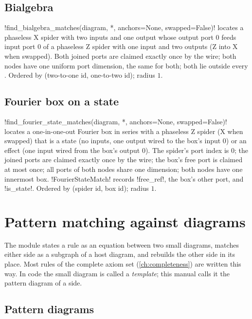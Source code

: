 \subsection{Bialgebra}

\py!find_bialgebra_matches(diagram, *, anchors=None, swapped=False)! locates a phaseless X spider
with two inputs and one output whose output port $0$ feeds input port $0$ of a phaseless Z spider
with one input and two outputs (Z into X when swapped). Both joined ports are claimed exactly once
by the wire; both nodes have one uniform port dimension, the same for both; both lie outside every
\bbox{}. Ordered by (two-to-one id, one-to-two id); radius $1$.

\subsection{Fourier box on a state}

\py!find_fourier_state_matches(diagram, *, anchors=None, swapped=False)! locates a one-in-one-out
Fourier box in series with a phaseless Z spider (X when swapped) that is a state (no inputs, one
output wired to the box's input $0$) or an effect (one input wired from the box's output $0$).
The spider's port index is $0$; the joined ports are claimed exactly once by the wire; the box's
free port is claimed at most once; all ports of both nodes share one dimension; both nodes have one
innermost box. \py!FourierStateMatch! records \py!free_ref!, the box's other port, and
\py!is_state!. Ordered by (spider id, box id); radius $1$.

\section{Pattern matching against diagrams}\label{sec:rewriting-template}

The module  states a rule as an equation between two
small diagrams, matches either side as a subgraph of a host diagram, and rebuilds the other side in
its place. Most rules of the complete axiom set (\cref{ch:completeness}) are written this way.
In code the small diagram is called a \emph{template}; this manual calls it the pattern
diagram of a side.

\subsection{Pattern diagrams}


